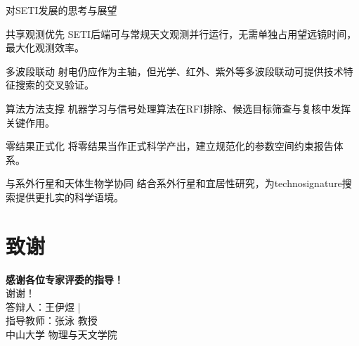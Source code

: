 \documentclass{sysupptthesis}
\begin{document}
\begin{frame}{对SETI发展的思考与展望}
    \begin{block}{共享观测优先}
        SETI后端可与常规天文观测并行运行，无需单独占用望远镜时间，最大化观测效率。
    \end{block}

    \begin{block}{多波段联动}
        射电仍应作为主轴，但光学、红外、紫外等多波段联动可提供技术特征搜索的交叉验证。
    \end{block}

    \begin{block}{算法方法支撑}
        机器学习与信号处理算法在RFI排除、候选目标筛查与复核中发挥关键作用。
    \end{block}

    \begin{block}{零结果正式化}
        将零结果当作正式科学产出，建立规范化的参数空间约束报告体系。
    \end{block}

    \begin{block}{与系外行星和天体生物学协同}
        结合系外行星和宜居性研究，为technosignature搜索提供更扎实的科学语境。
    \end{block}
\end{frame}

\section{致谢}

\begin{frame}
    \begin{center}
        {\Huge\textbf{感谢各位专家评委的指导！}}\\[2em]
        {\Large 谢谢！}\\[1em]
        {\normalsize 答辩人：王伊煜 \quad|}\\[0.3em]
        {\small 指导教师：张泳 教授\\
        中山大学 物理与天文学院}
    \end{center}
\end{frame}
\end{document}
